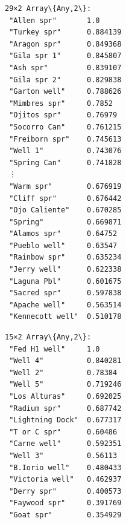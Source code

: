 \documentclass[11pt]{article}
\begin{document}
    
    \begin{Verbatim}[commandchars=\\\{\}]
29×2 Array\{Any,2\}:
 "Allen spr"       1.0
 "Turkey spr"      0.884139
 "Aragon spr"      0.849368
 "Gila spr 1"      0.845807
 "Ash spr"         0.839107
 "Gila spr 2"      0.829838
 "Garton well"     0.788626
 "Mimbres spr"     0.7852
 "Ojitos spr"      0.76979
 "Socorro Can"     0.761215
 "Freiborn spr"    0.745613
 "Well 1"          0.743076
 "Spring Can"      0.741828
 ⋮                 
 "Warm spr"        0.676919
 "Cliff spr"       0.676442
 "Ojo Caliente"    0.670285
 "Spring"          0.669871
 "Alamos spr"      0.64752
 "Pueblo well"     0.63547
 "Rainbow spr"     0.635234
 "Jerry well"      0.622338
 "Laguna Pbl"      0.601675
 "Sacred spr"      0.597838
 "Apache well"     0.563514
 "Kennecott well"  0.510178
    \end{Verbatim}

    
    
    \begin{Verbatim}[commandchars=\\\{\}]
15×2 Array\{Any,2\}:
 "Fed H1 well"     1.0
 "Well 4"          0.840281
 "Well 2"          0.78384
 "Well 5"          0.719246
 "Los Alturas"     0.692025
 "Radium spr"      0.687742
 "Lightning Dock"  0.677317
 "T or C spr"      0.60486
 "Carne well"      0.592351
 "Well 3"          0.56113
 "B.Iorio well"    0.480433
 "Victoria well"   0.462937
 "Derry spr"       0.400573
 "Faywood spr"     0.391769
 "Goat spr"        0.354929
    \end{Verbatim}

    
    \begin{center}
    \end{center}
    { \hspace*{\fill} \\}
    
\end{document}
